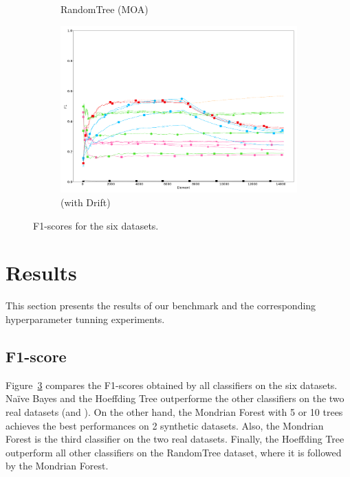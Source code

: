 \begin{figure}
\begin{subfigure}[t]{.49\linewidth}
		\caption{RandomTree (MOA)}
		\label{fig:f1-dataset_3}
	\end{subfigure}
	\hfill
	\begin{subfigure}[t]{.49\linewidth}
		\includegraphics[width=\linewidth]{figures/results/drift_3_f1.png}
		\caption{\banosdataset (with Drift)}
		\label{fig:f1-drift}
	\end{subfigure}
	\caption{F1-scores for the six datasets. 
	}
	\label{fig:f1}
\end{figure}

\section{Results}

This section presents the results of our benchmark and the corresponding
hyperparameter tunning experiments.

\subsection{F1-score}
Figure~\ref{fig:f1} compares the F1-scores obtained by all classifiers on the
six datasets.  Naïve Bayes and the Hoeffding Tree outperforme the other
classifiers on the two real datasets (\banosdataset and \recofitdataset).  On
the other hand, the Mondrian Forest with 5 or 10 trees achieves the best
performances on 2 synthetic datasets.  Also, the Mondrian Forest is the third
classifier on the two real datasets.  Finally, the Hoeffding Tree outperform
all other classifiers on the RandomTree dataset, where it is followed by the
Mondrian Forest.

